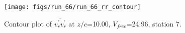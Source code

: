 \begin{figure}[H]
\centering
\texttt{[image: figs/run\_66/run\_66\_rr\_contour]}
\caption{Contour plot of $\overline{v_{r}^{\prime} v_{r}^{\prime}}$ at $z/c$=10.00, $V_{free}$=24.96, station 7.}
\label{fig:run_66_rr_contour}
\end{figure}



